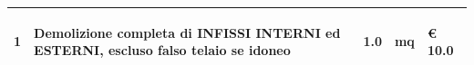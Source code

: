\documentclass[a4paper]{article}
\begin{document}
\begin{tabular}{ | L{10mm} |  L{86mm} | L{12mm} | L{12mm} | L{16mm} | }
                                   \vspace{2.5mm}
                                   \begin{spacing}{0}
                                1
                                   \end{spacing} &
                                   \vspace{2.5mm}
                                   \begin{spacing}{0}
                                Demolizione completa di INFISSI INTERNI ed ESTERNI, escluso falso telaio se idoneo
                                   \end{spacing} &
                                   \vspace{2.5mm}
                                   \begin{spacing}{0}
                                1.0
                                   \end{spacing} &
                                   \vspace{2.5mm}
                                   \begin{spacing}{0}
                                mq
                                   \end{spacing} &
                                   \vspace{2.5mm}
                                   \begin{spacing}{0}
                                     \euro\hfill 
                                 10.0
                                   \end{spacing} \\
                                   \hline


\end{tabular}
\end{document}
